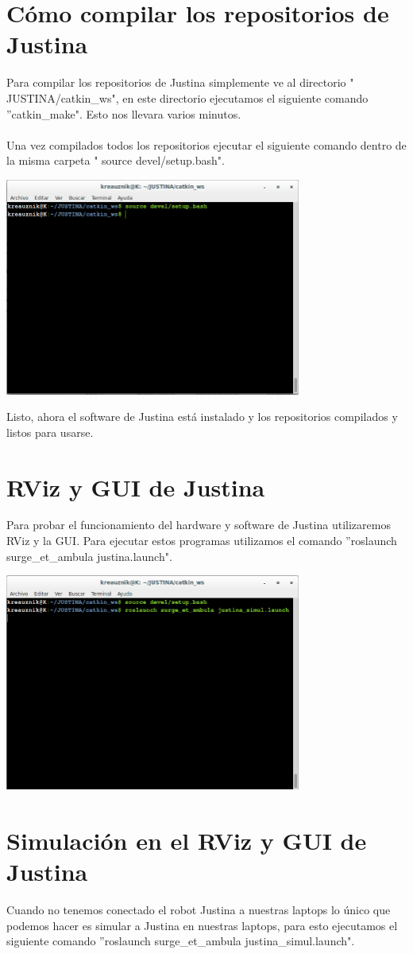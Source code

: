 \documentclass[user_manual.tex]{subfiles}
\begin{document}
\section{Cómo compilar los repositorios de Justina}
Para compilar los repositorios de Justina simplemente ve al directorio " JUSTINA/catkin\_ws", en este directorio ejecutamos el siguiente
comando ''catkin\_make". Esto nos llevara varios minutos.\\
\\
Una vez compilados todos los repositorios ejecutar el siguiente comando dentro de la misma carpeta " source devel/setup.bash".
 \begin{center}
\includegraphics[width=0.73\textwidth]{Figures/PP/pp5.png}
\end{center}

Listo, ahora el software de Justina está instalado y los repositorios compilados y listos para usarse.

\section{RViz y GUI de Justina}
Para probar el funcionamiento del hardware y software de Justina utilizaremos RViz y la GUI. Para ejecutar estos programas utilizamos el 
comando ''roslaunch surge\_et\_ambula justina.launch".
 \begin{center}
\includegraphics[width=0.73\textwidth]{Figures/PP/pp6.png}
\end{center}
\section{Simulación en el RViz y GUI de Justina}
Cuando no tenemos conectado el robot Justina a nuestras laptops lo único que podemos hacer
es simular a Justina en nuestras laptops, para esto ejecutamos el siguiente comando ''roslaunch surge\_et\_ambula justina\_simul.launch".
\end{document}
